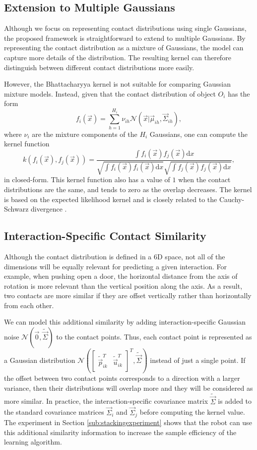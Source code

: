 \subsection{Extension to Multiple Gaussians}
Although we focus on representing contact distributions using single
Gaussians, the proposed framework is straightforward to extend to
multiple Gaussians. By representing the contact distribution as a
mixture of Gaussians, the model can capture more details of the distribution.
The resulting kernel can therefore distinguish between different contact
distributions more easily. 

However, the Bhattacharyya kernel is not suitable for comparing Gaussian mixture models. 
Instead, given that the contact distribution of object $O_{i}$ has the form
\[
f_{i}(\vec{x})=\sum_{h=1}^{H_{i}}\nu_{ih}\mathcal{N}(\vec{x}|\vec{\mu}_{ih},\vec{\Sigma}_{ih}),
\]
where $\nu_{i}$ are the mixture components of the $H_{i}$ Gaussians,
one can compute the kernel function
\[
k(f_{i}(\vec{x}),f_{j}(\vec{x}))=\frac{\int f_{i}(\vec{x})f_{j}(\vec{x})\text{d}x}{\sqrt{\int f_{i}(\vec{x})f_{i}(\vec{x})\text{d}x}\sqrt{\int f_{j}(\vec{x})f_{j}(\vec{x})\text{d}x}},
\]
in closed-form. This kernel function also has a value of $1$ when
the contact distributions are the same, and tends to zero as the overlap
decreases. The kernel is based
on the expected likelihood kernel \cite{JebaraProbabiltyProductKernels} and is closely related
to the Cauchy-Schwarz divergence \cite{Jenssen06}.

\subsection{Interaction-Specific Contact Similarity\label{sub:interspecvar}}

Although the contact distribution is defined in a 6D space, not all
of the dimensions will be equally relevant for predicting a given
interaction. For example, when pushing open a door, the horizontal
distance from the axis of rotation is more relevant than the vertical
position along the axis. As a result, two contacts are more similar if 
they are offset vertically rather than horizontally from each other. 

We can model this additional similarity by adding interaction-specific
Gaussian noise $\mathcal{N}(\vec{0},\tilde{\vec{\Sigma}})$ to the
contact points. Thus, each contact point is represented as a Gaussian
distribution $\mathcal{N}([\begin{array}{cc}
\tilde{\vec{p}}_{ik}^{T} & \tilde{\vec{u}}_{ik}^{T}\end{array}]^{T},\tilde{\vec{\Sigma}})$ instead of just a single point. If the offset between two contact
points corresponds to a direction with a larger variance, then their
distributions will overlap more and they will be considered as more
similar. In practice, the interaction-specific covariance matrix $\tilde{\vec{\Sigma}}$
is added to the standard covariance matrices $\vec{\Sigma}_{i}$ and
$\vec{\Sigma}_{j}$ before computing the kernel value. The experiment
in Section \ref{sub:stackingexperiment} shows that the robot can use this additional similarity
information to increase the sample efficiency of the learning algorithm.

